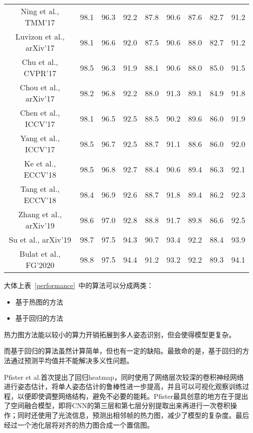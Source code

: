 \begin{table}[htbp]
\begin{tabular}{ccccccccc}
Ning et al., TMM'17\cite{ning2017knowledge}& 98.1  & 96.3  & 92.2  & 87.8  & 90.6  & 87.6 & 82.7 & 91.2\\
Luvizon et al., arXiv'17\cite{DBLP:journals/corr/abs-1710-02322}& 98.1  & 96.6  & 92.0  & 87.5  & 90.6  & 88.0 & 82.7 & 91.2\\
Chu et al., CVPR'17\cite{chu2017multi}& 98.5  & 96.3  & 91.9  & 88.1  & 90.6  & 88.0 & 85.0 & 91.5\\
Chou et al., arXiv'17\cite{DBLP:journals/corr/ChouCC17}& 98.2  & 96.8  & 92.2  & 88.0  & 91.3  & 89.1 & 84.9 & 91.8\\
Chen et al., ICCV'17\cite{chen2017adversarial}& 98.1  & 96.5  & 92.5  & 88.5  & 90.2  & 89.6 & 86.0 & 91.9\\
Yang et al., ICCV'17\cite{yang2017learning}& 98.5  & 96.7  & 92.5  & 88.7  & 91.1  & 88.6 & 86.0 & 92.0\\
Ke et al., ECCV'18\cite{Ke_2018_ECCV}& 98.5  & 96.8  & 92.7  & 88.4  & 90.6  & 89.4 & 86.3 & 92.1\\
Tang et al., ECCV'18\cite{Tang_2018_ECCV}& 98.4  & 96.9  & 92.6  & 88.7  & 91.8  & 89.4 & 86.2 & 92.3\\
Zhang et al., arXiv'19\cite{zhang2019human}& 98.6  & 97.0  & 92.8  & 88.8  & 91.7  & 89.8  & 86.6  & 92.5\\
Su et al., arXiv'19\cite{su2019cascade}& 98.7  & 97.5  & 94.3  & 90.7  & 93.4  & 92.2  & 88.4  & 93.9\\
Bulat et al., FG'2020\cite{bulat2020toward}& 98.8  & 97.5  & 94.4  & 91.2  & 93.2  & 92.2  & 89.3  & 94.1\\
\bottomrule[1.5pt]
\end{tabular}
\end{table}



大体上表~\ref{performance}~中的算法可以分成两类：
\begin{itemize}
\item 基于热图的方法
\item 基于回归的方法
\end{itemize}

热力图方法能以较小的算力开销拓展到多人姿态识别，但会使得模型更复杂。

而基于回归的算法虽然计算简单，但也有一定的缺陷。最致命的是，基于回归的方法通过预测平均值并不能解决多义性问题。

Pfister et al.首次提出了回归heatmap，同时使用了网络层次较深的卷积神经网络进行姿态估计，将单人姿态估计的鲁棒性进一步提高，并且可以可视化观察训练过程，以便即使调整网络结构，避免不必要的能耗。Pfister最具创意的地方在于提出了空间融合模型，即将CNN的第三层和第七层分别提取出来再进行一次卷积操作；同时还使用了光流信息，预测出相邻帧的热力图，减少了模型的复杂度。最后经过一个池化层将对齐的热力图合成一个置信图。

